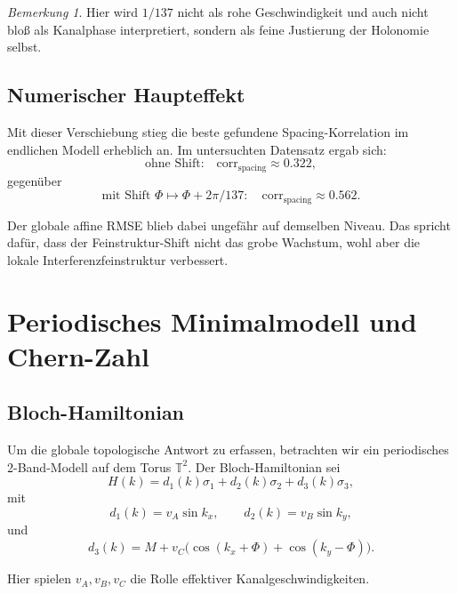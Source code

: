 \documentclass[11pt,a4paper]{article}
\theoremstyle{remark}
\newtheorem{bemerkung}[definition]{Bemerkung}
\newcommand{\T}{\mathbb{T}}
\begin{document}
	\begin{bemerkung}
		Hier wird $1/137$ nicht als rohe Geschwindigkeit und auch nicht bloß als Kanalphase interpretiert, sondern als feine Justierung der Holonomie selbst.
	\end{bemerkung}
	
	\subsection{Numerischer Haupteffekt}
	
	Mit dieser Verschiebung stieg die beste gefundene Spacing-Korrelation im endlichen Modell erheblich an. Im untersuchten Datensatz ergab sich:
	\begin{equation}
		\text{ohne Shift:}
		\quad
		\mathrm{corr}_{\mathrm{spacing}}\approx 0.322,
	\end{equation}
	gegenüber
	\begin{equation}
		\text{mit Shift }\Phi\mapsto \Phi+2\pi/137:
		\quad
		\mathrm{corr}_{\mathrm{spacing}}\approx 0.562.
	\end{equation}
	
	Der globale affine RMSE blieb dabei ungefähr auf demselben Niveau. Das spricht dafür, dass der Feinstruktur-Shift nicht das grobe Wachstum, wohl aber die lokale Interferenzfeinstruktur verbessert.
	
	\section{Periodisches Minimalmodell und Chern-Zahl}
	
	\subsection{Bloch-Hamiltonian}
	
	Um die globale topologische Antwort zu erfassen, betrachten wir ein periodisches 2-Band-Modell auf dem Torus $\T^2$. Der Bloch-Hamiltonian sei
	\begin{equation}
		H(k)=d_1(k)\sigma_1+d_2(k)\sigma_2+d_3(k)\sigma_3,
	\end{equation}
	mit
	\begin{equation}
		d_1(k)=v_A\sin k_x,
		\qquad
		d_2(k)=v_B\sin k_y,
	\end{equation}
	und
	\begin{equation}
		d_3(k)=M+v_C\bigl(\cos(k_x+\Phi)+\cos(k_y-\Phi)\bigr).
	\end{equation}
	
	Hier spielen $v_A,v_B,v_C$ die Rolle effektiver Kanalgeschwindigkeiten.
	
\end{document}
